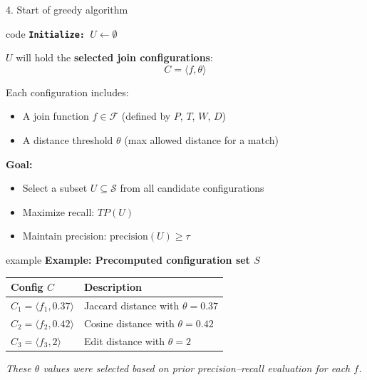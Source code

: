 \documentclass[8pt]{beamer} %
\begin{document}
\begin{frame}{4. Start of greedy algorithm}
	
	\begin{beamercolorbox}[rounded=true, shadow=true, leftskip=1em, rightskip=1em]{code}
	\texttt{\textbf{Initialize:} $U \leftarrow \emptyset$}
	\end{beamercolorbox}
	
		
	\vspace{1em}
	$U$ will hold the \textbf{selected join configurations}:
	$$
	C = \langle f, \theta \rangle
	$$
	
	Each configuration includes:
	\begin{itemize}
		\item A join function $f \in \mathcal{F}$ (defined by $P$, $T$, $W$, $D$)
		\item A distance threshold $\theta$ (max allowed distance for a match)
	\end{itemize}
	
	\vspace{0.5em}
	\textbf{Goal:}
	\begin{itemize}
		\item Select a subset $U \subseteq \mathcal{S}$ from all candidate configurations
		\item Maximize recall: $TP(U)$
		\item Maintain precision: $\text{precision}(U) \geq \tau$
	\end{itemize}
	
	\vspace{0.5em}
	\begin{beamercolorbox}[rounded=true, shadow=true, leftskip=1em, rightskip=1em]{example}
		\textbf{Example: Precomputed configuration set $S$}
		\begin{tabular}{ll}
			\textbf{Config $C$} & \textbf{Description} \\
			\hline
			$C_1 = \langle f_1, 0.37 \rangle$ & Jaccard distance with $\theta = 0.37$ \\
			$C_2 = \langle f_2, 0.42 \rangle$ & Cosine distance with $\theta = 0.42$ \\
			$C_3 = \langle f_3, 2 \rangle$    & Edit distance with $\theta = 2$ \\
		\end{tabular}
		
		\vspace{0.5em}
		\textit{These $\theta$ values were selected based on prior precision–recall evaluation for each $f$.}
		
	\end{beamercolorbox}
	
\end{frame}
\end{document}
